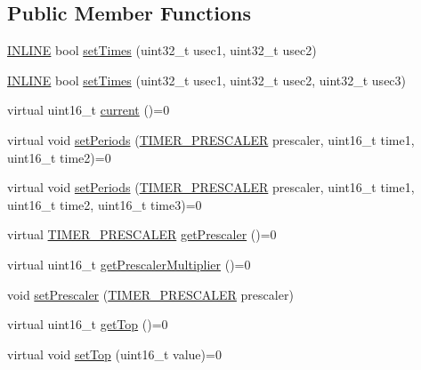 \subsection*{Public Member Functions}
\begin{DoxyCompactItemize}
\item 
\hyperlink{io_8h_a2eb6f9e0395b47b8d5e3eeae4fe0c116}{I\-N\-L\-I\-N\-E} bool \hyperlink{classmhvlib_1_1_timer_a64a6e8f18171e13f0f04a5ba5d078bbd}{set\-Times} (uint32\-\_\-t usec1, uint32\-\_\-t usec2)
\item 
\hyperlink{io_8h_a2eb6f9e0395b47b8d5e3eeae4fe0c116}{I\-N\-L\-I\-N\-E} bool \hyperlink{classmhvlib_1_1_timer_a60509e1955dbaab917b45bc6851c4537}{set\-Times} (uint32\-\_\-t usec1, uint32\-\_\-t usec2, uint32\-\_\-t usec3)
\item 
virtual uint16\-\_\-t \hyperlink{classmhvlib_1_1_timer_a10a1f5a2d2762a64bd525e4950b4b82d}{current} ()=0
\item 
virtual void \hyperlink{classmhvlib_1_1_timer_a574800a9f4055d1d20e05b241ed3b7dc}{set\-Periods} (\hyperlink{namespacemhvlib_ae280d2a7103fc576dbd0e8880c574e6c}{T\-I\-M\-E\-R\-\_\-\-P\-R\-E\-S\-C\-A\-L\-E\-R} prescaler, uint16\-\_\-t time1, uint16\-\_\-t time2)=0
\item 
virtual void \hyperlink{classmhvlib_1_1_timer_aab24ae5690d7638d258014cd1b8f63fb}{set\-Periods} (\hyperlink{namespacemhvlib_ae280d2a7103fc576dbd0e8880c574e6c}{T\-I\-M\-E\-R\-\_\-\-P\-R\-E\-S\-C\-A\-L\-E\-R} prescaler, uint16\-\_\-t time1, uint16\-\_\-t time2, uint16\-\_\-t time3)=0
\item 
virtual \hyperlink{namespacemhvlib_ae280d2a7103fc576dbd0e8880c574e6c}{T\-I\-M\-E\-R\-\_\-\-P\-R\-E\-S\-C\-A\-L\-E\-R} \hyperlink{classmhvlib_1_1_timer_a16dca27ad7f1fe2aa81e15bea22fab86}{get\-Prescaler} ()=0
\item 
virtual uint16\-\_\-t \hyperlink{classmhvlib_1_1_timer_acf81c55aa93235d46038e80259036fc7}{get\-Prescaler\-Multiplier} ()=0
\item 
void \hyperlink{classmhvlib_1_1_timer_a1b9a54b7daf244396f07b27858802505}{set\-Prescaler} (\hyperlink{namespacemhvlib_ae280d2a7103fc576dbd0e8880c574e6c}{T\-I\-M\-E\-R\-\_\-\-P\-R\-E\-S\-C\-A\-L\-E\-R} prescaler)
\item 
virtual uint16\-\_\-t \hyperlink{classmhvlib_1_1_timer_a04d9d2ac51d0b5f2abfc9e63f98f3c9c}{get\-Top} ()=0
\item 
virtual void \hyperlink{classmhvlib_1_1_timer_a8c066e145941b93e32bcd44d552fd6e2}{set\-Top} (uint16\-\_\-t value)=0
\item 

\end{DoxyCompactItemize}

